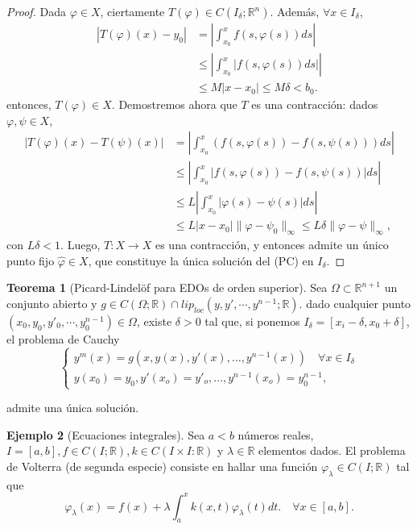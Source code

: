 \documentclass[11pt]{article}
\theoremstyle{definition} %
\newtheorem{theorem}{Teorema}[section]
\newtheorem{example}[theorem]{Ejemplo}
\newcommand{\R}{\mathbb{R}}
\begin{document}
\begin{proof}
	\noindent Dada $\varphi \in X$, ciertamente $T(\varphi) \in C(I_{\delta};\R^n)$. Además, $\forall x \in I_{\delta}$,
	\begin{align*}
		|T(\varphi)(x)-y_{0}| & = \left| \int_{x_{0}}^{x} f(s,\varphi(s))ds \right| \\ 
		& \leq \left| \int_{x_{0}}^{x} |f(s,\varphi(s))ds| \right| \\
		& \leq M |x-x_{0}| \leq M\delta < b_0
	.\end{align*}
	entonces, $T(\varphi) \in X$.
	Demostremos ahora que $T$ es una contracción: dados $\varphi,\psi \in X$, 
	\begin{align*}
		|T(\varphi)(x)-T(\psi)(x)| & = \left| \int_{x_{0}}^{x} (f(s,\varphi(s))-f(s,\psi(s)))ds \right| \\
		& \leq \left| \int_{x_{0}}^{x} |f(s,\varphi(s))-f(s,\psi(s))| ds \right| \\
		& \leq L \left| \int_{x_{0}}^{x}|\varphi(s)-\psi(s)|ds \right| \\
		& \leq L|x-x_{0}| \| \varphi - \psi_0 \|_{\infty} \leq L \delta \| \varphi - \psi \|_{\infty},
	\end{align*}
	con $L\delta<1$. Luego, $T: X \to X$ es una contracción, y entonces admite un único punto fijo $\hat{\varphi} \in X$, que constituye la única solución del (PC) en $I_{\delta}$. 
\end{proof}
 
\begin{theorem}[Picard-Lindelöf para EDOs de orden superior] 
  Sea $\Omega \subset \R^{n+1}$ un conjunto abierto y $g \in C(\Omega;\R)\cap lip_{loc}(y,y',\cdots, y^{n-1};\R)$. dado cualquier punto $(x_0,y_0,y'_0,\cdots,y_0^{n-1})\in \Omega$, existe $\delta > 0$ tal que, si ponemos $I_{\delta}=[x_i -\delta, x_0+ \delta]$, el problema de Cauchy
  \[
    \begin{cases}
      y^{m}(x)=g(x,y(x),y'(x),\ldots,y^{n-1}(x)) \quad \forall x \in I_{\delta} \\
      y(x_0)=y_0, y'(x_o)=y'_o,\ldots, y^{n-1}(x_o)=y_0^{n-1},
    \end{cases}
  \]
       
  admite una única solución.

\end{theorem}

\begin{example}[Ecuaciones integrales] 
    Sea $a<b$ números reales, $I=[a,b], f\in C(I;\R), k\in C(I\times I:\R)$ y $\lambda \in \R$ elementos dados. El problema de Volterra (de segunda especie) consiste en hallar una función $\varphi_{\lambda}\in C(I;\R)$ tal que 
  \[
    \varphi_{\lambda}(x)=f(x)+\lambda\int_{a}^{x}k(x,t)\varphi_{\lambda}(t)dt.\quad \forall x \in [a,b].
  \]
\end{example}
\end{document}
